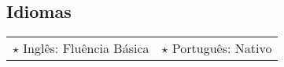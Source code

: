 \documentclass[a4paper, oneside, final]{scrartcl}
\newcommand{\vspc}{\vspace{0.15cm}} %
\begin{document}
\begin{center}
  
  
  

\section{Idiomas}
\begin{tabularx}{1\linewidth}{p{6cm}X}
$\star$ Inglês: Fluência Básica & $\star$ Português: Nativo\\
\end{tabularx}



\end{center}
\end{document}
